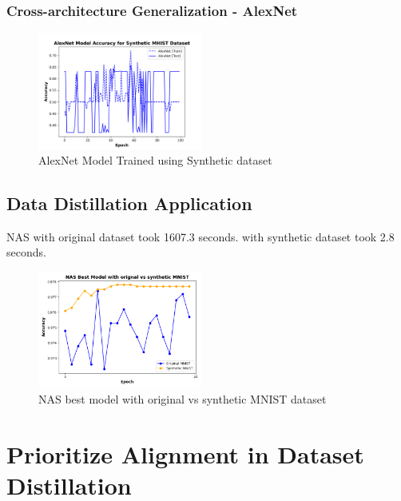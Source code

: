 \documentclass[conference, compsoc]{IEEEtran}
\begin{document}
\subsubsection{Cross-architecture Generalization - AlexNet}
\begin{figure}[H]
	\centering
	\includegraphics[width=0.48\textwidth]{mhist_alex_acc.png}
	\caption{AlexNet Model Trained using Synthetic dataset}
	\label{fig:mhist_alex_acc}
\end{figure}

\subsection{Data Distillation Application}
NAS with original dataset took 1607.3 seconds.
with synthetic dataset took 2.8 seconds.

\begin{figure}[H]
	\centering
	\includegraphics[width=0.48\textwidth]{nas_comparision.png}
	\caption{NAS best model with original vs synthetic MNIST dataset}
	\label{fig:nas_comparision}
\end{figure}

\section{Prioritize Alignment in Dataset Distillation}
\end{document}

